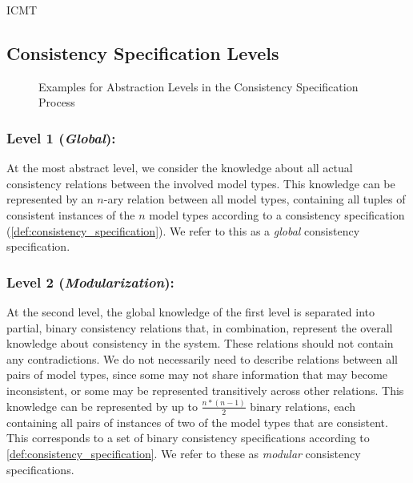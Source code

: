 \begin{copiedFrom}{ICMT}

\subsection{Consistency Specification Levels}
\label{chap:properties:levels}

\begin{figure}
    \centering
    
    \caption{Examples for Abstraction Levels in the Consistency Specification Process}
    \label{fig:properties:levels_overview}
\end{figure}


\subsubsection*{Level 1 (\emph{Global}):}
At the most abstract level, we consider the knowledge about all actual consistency relations between the involved model types.
This knowledge can be represented by an $n$-ary relation between all model types, containing all tuples of consistent instances of the $n$ model types according to a consistency specification (\autoref{def:consistency_specification}). 
We refer to this as a \emph{global} consistency specification.

\subsubsection*{Level 2 (\emph{Modularization}):} 
At the second level, the global knowledge of the first level is separated into partial, binary consistency relations that, in combination, represent the overall knowledge about consistency in the system.
These relations should not contain any contradictions.
We do not necessarily need to describe relations between all pairs of model types, since some may not share information that may become inconsistent, or some may be represented transitively across other relations.
This knowledge 
can be represented by up to $\frac{n*(n-1)}{2}$ binary relations, each containing all pairs of instances of two of the model types that are consistent.
This corresponds to a set of binary consistency specifications according to \autoref{def:consistency_specification}.
We refer to these as \emph{modular} consistency specifications.\\[-1em]


\end{copiedFrom}
